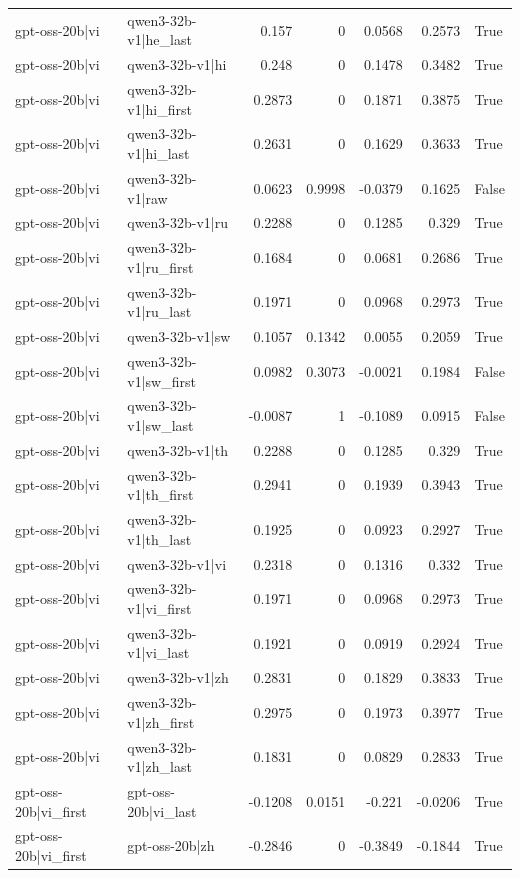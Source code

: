 \begin{table}
\begin{tabular}{l l r r r r l}
gpt-oss-20b|vi & qwen3-32b-v1|he_last & 0.157 & 0 & 0.0568 & 0.2573 & True \\
gpt-oss-20b|vi & qwen3-32b-v1|hi & 0.248 & 0 & 0.1478 & 0.3482 & True \\
gpt-oss-20b|vi & qwen3-32b-v1|hi_first & 0.2873 & 0 & 0.1871 & 0.3875 & True \\
gpt-oss-20b|vi & qwen3-32b-v1|hi_last & 0.2631 & 0 & 0.1629 & 0.3633 & True \\
gpt-oss-20b|vi & qwen3-32b-v1|raw & 0.0623 & 0.9998 & -0.0379 & 0.1625 & False \\
gpt-oss-20b|vi & qwen3-32b-v1|ru & 0.2288 & 0 & 0.1285 & 0.329 & True \\
gpt-oss-20b|vi & qwen3-32b-v1|ru_first & 0.1684 & 0 & 0.0681 & 0.2686 & True \\
gpt-oss-20b|vi & qwen3-32b-v1|ru_last & 0.1971 & 0 & 0.0968 & 0.2973 & True \\
gpt-oss-20b|vi & qwen3-32b-v1|sw & 0.1057 & 0.1342 & 0.0055 & 0.2059 & True \\
gpt-oss-20b|vi & qwen3-32b-v1|sw_first & 0.0982 & 0.3073 & -0.0021 & 0.1984 & False \\
gpt-oss-20b|vi & qwen3-32b-v1|sw_last & -0.0087 & 1 & -0.1089 & 0.0915 & False \\
gpt-oss-20b|vi & qwen3-32b-v1|th & 0.2288 & 0 & 0.1285 & 0.329 & True \\
gpt-oss-20b|vi & qwen3-32b-v1|th_first & 0.2941 & 0 & 0.1939 & 0.3943 & True \\
gpt-oss-20b|vi & qwen3-32b-v1|th_last & 0.1925 & 0 & 0.0923 & 0.2927 & True \\
gpt-oss-20b|vi & qwen3-32b-v1|vi & 0.2318 & 0 & 0.1316 & 0.332 & True \\
gpt-oss-20b|vi & qwen3-32b-v1|vi_first & 0.1971 & 0 & 0.0968 & 0.2973 & True \\
gpt-oss-20b|vi & qwen3-32b-v1|vi_last & 0.1921 & 0 & 0.0919 & 0.2924 & True \\
gpt-oss-20b|vi & qwen3-32b-v1|zh & 0.2831 & 0 & 0.1829 & 0.3833 & True \\
gpt-oss-20b|vi & qwen3-32b-v1|zh_first & 0.2975 & 0 & 0.1973 & 0.3977 & True \\
gpt-oss-20b|vi & qwen3-32b-v1|zh_last & 0.1831 & 0 & 0.0829 & 0.2833 & True \\
gpt-oss-20b|vi_first & gpt-oss-20b|vi_last & -0.1208 & 0.0151 & -0.221 & -0.0206 & True \\
gpt-oss-20b|vi_first & gpt-oss-20b|zh & -0.2846 & 0 & -0.3849 & -0.1844 & True \\

\end{tabular}
\end{table}
